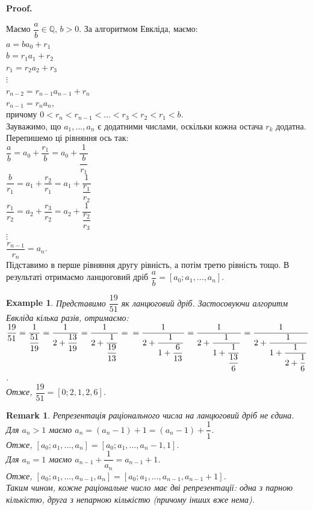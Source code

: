 \documentclass[a4paper, 10pt]{article}
\makeatletter
\theoremstyle{theoremdd}
\theoremstyle{theoremdd}
\theoremstyle{theoremdd}
\theoremstyle{theoremdd}
\newtheorem{example}[theorem]{Example}
\theoremstyle{theoremdd}
\theoremstyle{theoremdd}
\newtheorem{remark}[theorem]{Remark}
\theoremstyle{theoremdd}
\theoremstyle{theoremdd}
\renewenvironment{proof}[1][Proof.\\]{\par
\pushQED{\hfill \qed}%
\normalfont \topsep6\p@\@plus6\p@\relax
\trivlist
\item\relax
{\bfseries
#1\@addpunct{.}}\hspace\labelsep\ignorespaces
}{%
\popQED\endtrivlist\@endpefalse
}
\makeatother
\begin{document}
\begin{proof}
Маємо $\dfrac{a}{b} \in \mathbb{Q}$, $b >0$. За алгоритмом Евкліда, маємо:\\
$a = ba_0 + r_1$\\
$b = r_1a_1 + r_2$\\
$r_1 = r_2a_2 + r_3$\\
$\vdots$\\
$r_{n-2} = r_{n-1}a_{n-1} + r_n$\\
$r_{n-1} = r_na_n$,\\
причому $0 < r_n < r_{n-1} < \dots < r_3 < r_2 < r_1 < b$.\\
Зауважимо, що $a_1,\dots,a_n$ є додатними числами, оскільки кожна остача $r_k$ додатна. Перепишемо ці рівняння ось так:\\
$\dfrac{a}{b} = a_0 + \dfrac{r_1}{b} = a_0 + \dfrac{1}{\dfrac{b}{r_1}}$\\
$\dfrac{b}{r_1} = a_1 + \dfrac{r_2}{r_1} = a_1 + \dfrac{1}{\dfrac{r_1}{r_2}}$\\
$\dfrac{r_1}{r_2} = a_2 + \dfrac{r_3}{r_2} = a_2 + \dfrac{1}{\dfrac{r_2}{r_3}}$\\
$\vdots$\\
$\dfrac{r_{n-1}}{r_n} = a_n$.\\
Підставимо в перше рівняння другу рівність, а потім третю рівність тощо. В результаті отримаємо ланцюговий дріб $\dfrac{a}{b} = [a_0;a_1,\dots,a_n]$.
\end{proof}

\begin{example}
Представимо $\dfrac{19}{51}$ як ланцюговий дріб. Застосовуючи алгоритм Евкліда кілька разів, отримаємо:\\
$\dfrac{19}{51} = \dfrac{1}{\dfrac{51}{19}} = \dfrac{1}{2 + \dfrac{13}{19}} = \dfrac{1}{2 + \dfrac{1}{\dfrac{19}{13}}} = \\ = \dfrac{1}{2 + \dfrac{1}{1 + \dfrac{6}{13}}} = \dfrac{1}{2 + \dfrac{1}{1 + \dfrac{1}{\dfrac{13}{6}}}} = \dfrac{1}{2 + \dfrac{1}{1 + \dfrac{1}{2 + \dfrac{1}{6}}}}$.\\
Отже, $\dfrac{19}{51} = [0;2,1,2,6]$.
\end{example}

\begin{remark}
Репрезентація раціонального числа на ланцюговий дріб не єдина.\\
Для $a_n > 1$ маємо $a_n = (a_n-1)+1 = (a_n-1) + \dfrac{1}{1}$.\\
Отже, $[a_0;a_1,\dots,a_n] = [a_0;a_1,\dots,a_{n}-1,1]$.\\
Для $a_n = 1$ маємо $a_{n-1} + \dfrac{1}{a_n} = a_{n-1}+1$.\\
Отже, $[a_0;a_1,\dots,a_{n-1},a_n] = [a_0;a_1,\dots,a_{n-1},a_{n-1}+1]$.
\bigskip \\
Таким чином, кожне раціональне число має дві репрезентації: одна з парною кількістю, друга з непарною кількістю (причому інших вже нема).
\end{remark}
\end{document}
